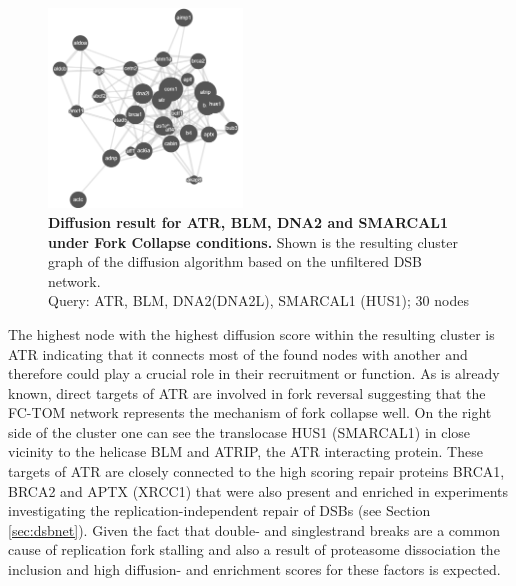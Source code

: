 \begin{figure}
    \includegraphics[width=0.46\textwidth]{resources/images/Results/fc_atrtargets.PNG}
    \caption[Diffusion result for ATR, BLM, DNA2 and SMARCAL1 under Fork Collapse conditions]{\textbf{Diffusion result for ATR, BLM, DNA2 and SMARCAL1 under Fork Collapse conditions. }Shown is the resulting cluster graph of the diffusion algorithm based on the unfiltered DSB network.\\Query: ATR, BLM, DNA2(DNA2L), SMARCAL1 (HUS1); 30 nodes}
    \label{fig:atrtarget_diff_fc}
\end{figure}
The highest node with the highest diffusion score within the resulting cluster is ATR indicating that it connects most of the found nodes with another and therefore could play a crucial role in their recruitment or function. As is already known, direct targets of ATR are involved in fork reversal suggesting that the FC-TOM network represents the mechanism of fork collapse well. On the right side of the cluster one can see the translocase HUS1 (SMARCAL1) in close vicinity to the helicase BLM and ATRIP, the ATR interacting protein. These targets of ATR are closely connected to the high scoring repair proteins BRCA1, BRCA2 and APTX (XRCC1) that were also present and enriched in experiments investigating the replication-independent repair of DSBs (see Section \ref{sec:dsbnet}). Given the fact that double- and singlestrand breaks are a common cause of replication fork stalling and also a result of proteasome dissociation \citep{Cortez.2015} the inclusion and high diffusion- and enrichment scores for these factors is expected. 



